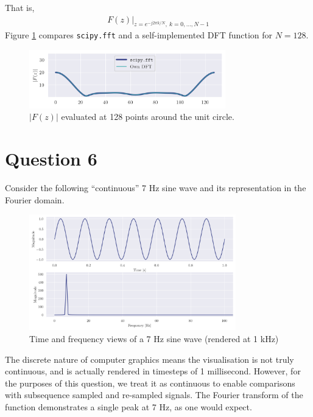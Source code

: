 \documentclass[a4paper, 11pt]{article}
\begin{document}
\begin{enumerate}[label=\alph*)]
    That is,
    \begin{align*}
        F(z) \big|_{z=e^{-j2\pi k/N},\ k=0,\ldots,N-1}
    \end{align*}
    Figure \ref{fig:q5b_dftsample} compares \texttt{scipy.fft} and a
    self-implemented DFT function for $N=128$.
    \begin{figure}[ht]
        \centering
        \includegraphics[width=0.76\textwidth]{images/q5b_dftsample.png}
        \caption{$|F(z)|$ evaluated at 128 points around the unit circle.}
        \label{fig:q5b_dftsample}
    \end{figure}

\end{enumerate}

\newpage
\section*{Question 6}

Consider the following ``continuous'' 7 Hz sine wave and its representation in
the Fourier domain.
\begin{figure}[ht]
    \centering
    \includegraphics[width=0.8\textwidth]{images/q6_sine7hz.png}
    \caption{Time and frequency views of a 7 Hz sine wave (rendered at
        1 kHz)}
    \label{fig:q6_sine7hz}
\end{figure}

The discrete nature of computer graphics means the visualisation is not truly
continuous, and is actually rendered in timesteps of 1 millisecond. However, for
the purposes of this question, we treat it as continuous to enable comparisons
with subsequence sampled and re-sampled signals. The Fourier transform of the
function demonstrates a single peak at 7 Hz, as one would expect.
\end{document}
